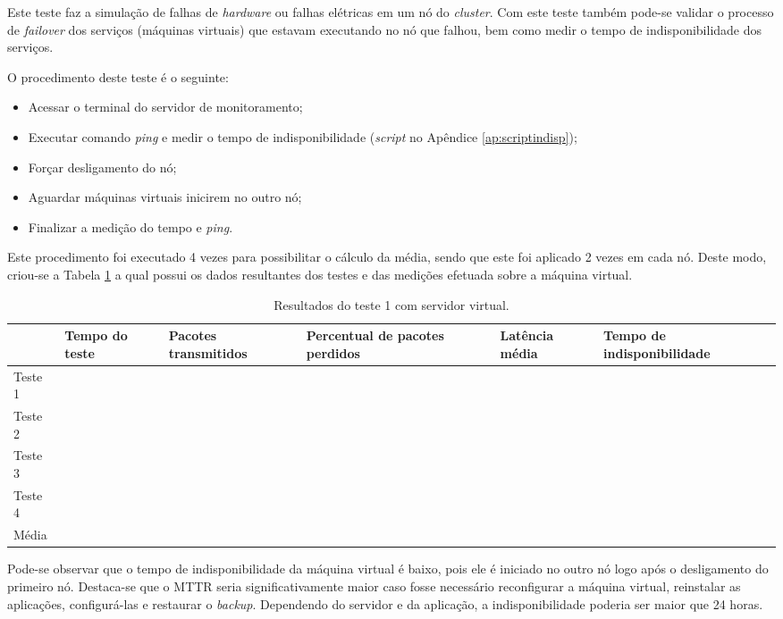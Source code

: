 Este teste faz a simulação de falhas de \textit{hardware} ou falhas elétricas em um nó do \textit{cluster}. Com este teste também pode-se 
validar o processo de \textit{failover} dos serviços (máquinas virtuais) que estavam executando no nó que falhou, bem como medir o tempo de 
indisponibilidade dos serviços.

O procedimento deste teste é o seguinte:
\begin{itemize}
 \item Acessar o terminal do servidor de monitoramento;
 \item Executar comando \textit{ping} e medir o tempo de indisponibilidade (\textit{script} no Apêndice \ref{ap:scriptindisp});
 \item Forçar desligamento do nó;
 \item Aguardar máquinas virtuais inicirem no outro nó;
 \item Finalizar a medição do tempo e \textit{ping}.
\end{itemize}

Este procedimento foi executado 4 vezes para possibilitar o cálculo da média, sendo que este foi aplicado 2 vezes em cada nó. Deste modo, 
criou-se a Tabela \ref{tab:teste1resultados} a qual possui os dados resultantes dos testes e das medições efetuada sobre a máquina virtual.

\begin{table}[h!]
\caption{Resultados do teste 1 com servidor virtual.}
\label{tab:teste1resultados}
\begin{center}
\begin{tabular}{|l|p{1.5cm}|p{2.5cm}|p{2.5cm}|p{2.5cm}|p{3cm}|}\hline
 & \textbf{Tempo do teste} & \textbf{Pacotes transmitidos} & \textbf{Percentual de pacotes perdidos} & \textbf{Latência média} & \textbf{Tempo de indisponibilidade} \\\hline
Teste 1 & & & & & \\\hline
Teste 2 & & & & & \\\hline
Teste 3 & & & & & \\\hline
Teste 4 & & & & & \\\hline
Média & & & & & \\\hline
\end{tabular}
\end{center}
\end{table}

Pode-se observar que o tempo de indisponibilidade da máquina virtual é baixo, pois ele é iniciado no outro nó logo após o desligamento do 
primeiro nó. Destaca-se que o \ac{MTTR} seria significativamente maior caso fosse necessário reconfigurar a máquina virtual, reinstalar as 
aplicações, configurá-las e restaurar o \textit{backup}. Dependendo do servidor e da aplicação, a indisponibilidade poderia ser maior que 24 horas.


